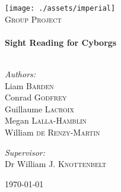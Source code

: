 \begin{titlepage}
    \begin{center}
        \texttt{[image: ./assets/imperial]}~\\[1cm]
        \textsc{\LARGE Group Project} \\[0.5cm]
        \HRule \\[0.4cm]
        {\huge \bfseries Sight Reading for Cyborgs \\[0.4cm]}
        \HRule \\[1.5cm]
            \begin{flushleft}
                \large
                \emph{Authors:}\\
                Liam \textsc{Barden}\\
                Conrad \textsc{Godfrey}\\
                Guillaume \textsc{Lacroix}\\
                Megan \textsc{Lalla-Hamblin}\\
                William \textsc{de Renzy-Martin}\\
            \end{flushleft}
            \begin{flushright}
                \large
                \emph{Supervisor:}\\
                Dr William J. \textsc{Knottenbelt}
            \end{flushright}
        \vfill
        {\large \today}
    \end{center}
\end{titlepage}
